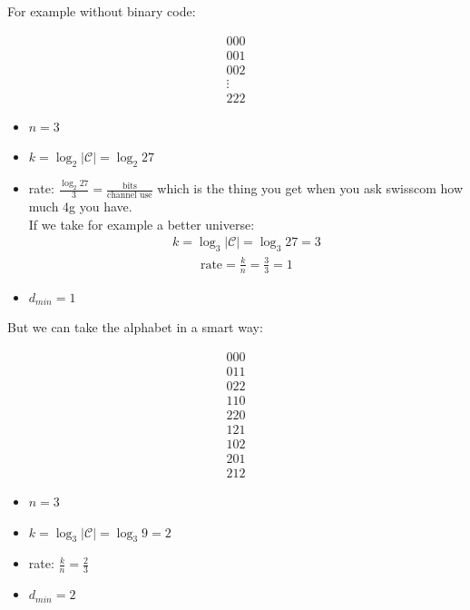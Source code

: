     For example without binary code:
    \begin{minipage}{0.5\textwidth}
    \begin{align*} 000\\001\\002\\ \vdots\\ 222 \end{align*}
    \end{minipage}
    \begin{minipage}{0.5\textwidth}
    \begin{itemize}
        \item $n = 3$
        \item $k = \log_2 \left|\mathcal{C}\right| = \log_2 27 $
        \item rate: $\frac{\log_2 27}{3} = \frac{\text{bits}}{\text{channel use}}$ which is the thing you get when you ask swisscom how much 4g you have.
\\ If we take for example a better universe: 
\begin{align*} k = \log_3 \left|\mathcal{C}\right| = \log_3 27 = 3
\end{align*}
\begin{align*} \text{rate} =  \frac{k}{n} = \frac{3}{3} =  1 \end{align*}
        \item $d_{min} = 1$
    \end{itemize}
 
\end{minipage} 
    
But we can take the alphabet in a smart way:
\begin{minpage}{0.5\textwidth}
    \begin{align*} 000\\011\\022\\110\\220\\121\\102\\201\\212 \end{align*}
\end{minpage}
    \begin{minipage}{0.5\textwidth}
     \begin{itemize}
        \item $n = 3$
        \item $k = \log_3 \left|\mathcal{C}\right| = \log_3 9 = 2$
        \item rate: $\frac{k}{n} = \frac{2}{3}$
        \item $d_{min} = 2$
    \end{itemize}
    \end{minipage}


